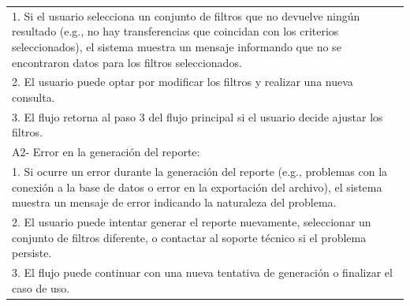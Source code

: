 \documentclass[stu, 12pt, letterpaper, donotrepeattitle, floatsintext, natbib]{apa7}
\begin{document}
\begin{longtable}{@{} p{16.5cm} @{}}
    \hspace{1cm}1. Si el usuario selecciona un conjunto de filtros que no devuelve ning\'un resultado (e.g., no hay transferencias que coincidan con los criterios seleccionados), el sistema muestra un mensaje informando que no se encontraron datos para los filtros seleccionados. \\
    \hspace{1cm}2. El usuario puede optar por modificar los filtros y realizar una nueva consulta.                                                                                                                                                                                      \\
    \hspace{1cm}3. El flujo retorna al paso 3 del flujo principal si el usuario decide ajustar los filtros.                                                                                                                                                                             \\
    A2- Error en la generaci\'on del reporte:                                                                                                                                                                                                                                           \\
    \hspace{1cm}1. Si ocurre un error durante la generaci\'on del reporte (e.g., problemas con la conexi\'on a la base de datos o error en la exportaci\'on del archivo), el sistema muestra un mensaje de error indicando la naturaleza del problema.                                  \\
    \hspace{1cm}2. El usuario puede intentar generar el reporte nuevamente, seleccionar un conjunto de filtros diferente, o contactar al soporte t\'ecnico si el problema persiste.                                                                                                     \\
    \hspace{1cm}3. El flujo puede continuar con una nueva tentativa de generaci\'on o finalizar el caso de uso.                                                                                                                                                                         \\ \bottomrule
\end{longtable}
\newpage
\end{document}
